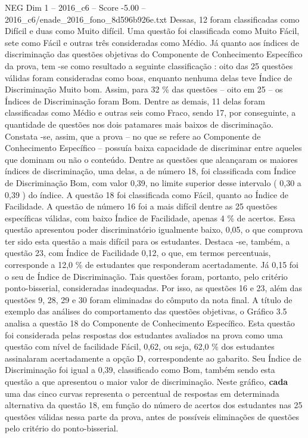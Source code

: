 \begin{textsample}{NEG Dim 1 – 2016\_c6 – Score -5.00 – 2016\_c6/enade\_2016\_fono\_8d596b926e.txt}
Dessas, 12 foram classificadas como Difícil e duas como Muito difícil.
Uma questão foi classificada como Muito Fácil, sete como Fácil e outras três consideradas como Médio.
Já quanto aos índices de discriminação das questões objetivas do Componente de Conhecimento Específico da prova, tem -se como resultado a seguinte classificação : oito das 25 questões válidas foram consideradas como boas, enquanto nenhuma delas teve Índice de Discriminação Muito bom.
Assim, para 32 \% das questões – oito em 25 – os Índices de Discriminação foram Bom.
Dentre as demais, 11 delas foram classificadas como Médio e outras seis como Fraco, sendo 17, por conseguinte, a quantidade de questões nos dois patamares mais baixos de discriminação.
Constata -se, assim, que a prova – no que se refere ao Componente de Conhecimento Específico – possuía baixa capacidade de discriminar entre aqueles que dominam ou não o conteúdo.
Dentre as questões que alcançaram os maiores índices de discriminação, uma delas, a de número 18, foi classificada com Índice de Discriminação Bom, com valor 0,39, no limite superior desse intervalo ( 0,30 a 0,39 ) do índice.
A questão 18 foi classificada como Fácil, quanto ao Índice de Facilidade.
A questão de número 16 foi a mais difícil dentre as 25 questões específicas válidas, com baixo Índice de Facilidade, apenas 4 \% de acertos.
Essa questão apresentou poder discriminatório igualmente baixo, 0,05, o que comprova ter sido esta questão a mais difícil para os estudantes.
Destaca -se, também, a questão 23, com Índice de Facilidade 0,12, o que, em termos percentuais, corresponde a 12,0 \% de estudantes que responderam acertadamente.
Já 0,15 foi o seu de Índice de Discriminação.
Tais questões foram, portanto, pelo critério ponto-bisserial, consideradas inadequadas.
Por isso, as questões 16 e 23, além das questões 9, 28, 29 e 30 foram eliminadas do cômputo da nota final.
A título de exemplo das análises do comportamento das questões objetivas, o Gráfico 3.5 analisa a questão 18 do Componente de Conhecimento Específico.
Esta questão foi considerada pelas respostas dos estudantes avaliados na prova como uma questão com nível de facilidade Fácil, 0,62, ou seja, 62,0 \% dos estudantes assinalaram acertadamente a opção D, correspondente ao gabarito.
Seu Índice de Discriminação foi igual a 0,39, classificado como Bom, também sendo esta questão a que apresentou o maior valor de discriminação.
Neste gráfico, \textbf{cada} uma das cinco curvas representa o percentual de respostas em determinada alternativa da questão 18, em função do número de acertos dos estudantes nas 25 questões válidas nessa parte da prova, antes de possíveis eliminações de questões pelo critério do ponto-bisserial.

\end{textsample}
